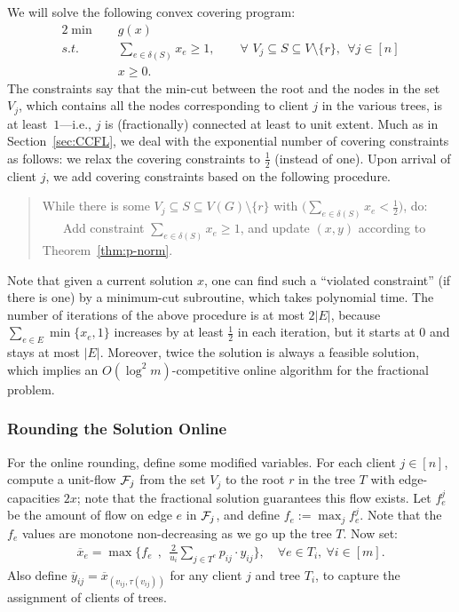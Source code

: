 \documentclass[letterpaper,11pt]{article}
\newcommand{\ox}{\ensuremath{\overline{x}}\xspace}
\newcommand{\oy}{\ensuremath{\overline{y}}\xspace}
\def\oy{\overline{y}}
\def\ox{\overline{x}}
\begin{document}
We will solve the following convex covering program:
\begin{alignat*}{2}
  \min & \quad g(x) \\
  s.t. & \quad \textstyle \sum_{e\in \delta(S)} x_e \geq 1, \qquad
  \forall \, \, V_j\subseteq S \subseteq V\setminus \{r\},~~\forall j\in [n]\\
  &\quad x \geq 0.
\end{alignat*}
The constraints say that the min-cut between the root and the nodes in
the set $V_j$, which contains all the nodes corresponding to client $j$
in the various trees, is at least~$1$---i.e., $j$ is (fractionally)
connected at least to unit extent. Much as in Section~\ref{sec:CCFL}, we
deal with the exponential number of covering constraints as follows: we
relax the covering constraints to $\frac12$ (instead of one). Upon
arrival of client $j$, we add covering constraints based on the
following procedure.

\begin{quote}
  While there is some $V_j \subseteq S\subseteq V(G)\setminus \{r\}$
  with $\big(\sum_{e\in \delta(S)} x_e < \frac12\big)$, do: \\
  $~~~~~~$ Add constraint $\sum_{e\in \delta(S)} x_e \ge 1$, and update
  $(x,y)$ according to Theorem~\ref{thm:p-norm}.
\end{quote}

Note that given a current solution $x$, one can find such a ``violated
constraint'' (if there is one) by a minimum-cut subroutine, which takes
polynomial time. The number of iterations of the above procedure is at
most $2|E|$, because $\sum_{e\in E} \min\{x_e,1\}$ increases by at least
$\frac12$ in each iteration, but it starts at $0$ and stays at most
$|E|$. Moreover, twice the solution is always a feasible solution, which
implies an $O(\log^2 m)$-competitive online algorithm for the fractional
problem.

\subsubsection{Rounding the Solution Online}
\label{sec:cmc-round}

For the online rounding, define some modified variables. For each client
$j\in[n]$, compute a unit-flow ${\cal F}_j$ from the set $V_j$ to the
root $r$ in the tree $T$ with edge-capacities $2x$; note that the
fractional solution guarantees this flow exists. Let $f_{e}^j$ be the
amount of flow on edge $e$ in ${\cal F}_j$, and define $f_e :=\max_{j}
f^j_e$. Note that the $f_e$ values are monotone non-decreasing as we go
up the tree $T$. Now set:
\begin{gather}
  \ox_e = \max\bigg\{ f_{e} ~~,~~ \frac{2}{u_i}\sum_{j\in T^e} p_{ij}
  \cdot y_{ij} \bigg\},\quad \forall e\in T_i,~ \forall i\in[m].
\end{gather}
Also define $\oy_{ij} = \ox_{(v_{ij},\tau(v_{ij}))}$ for any client $j$ and
tree $T_i$, to capture the assignment of clients of trees.
\end{document}
